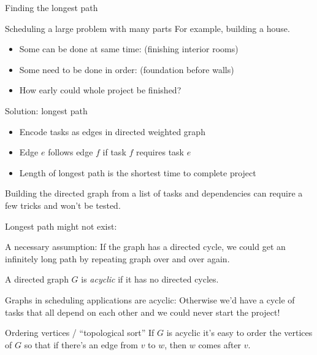 \documentclass{beamer}
\begin{document}
\begin{frame}{Finding the longest path}
  \begin{block}{Scheduling a large problem with many parts}
For example, building a house.
    \begin{itemize}
    \item Some can be done at same time: (finishing interior rooms)
    \item Some need to be done in order: (foundation before walls)
    \item How early could whole project be finished?
    \end{itemize}
  \end{block}
  \begin{block}{Solution: longest path}
    \begin{itemize}
    \item  Encode tasks as edges in directed weighted graph        
    \item Edge $e$ follows edge $f$ if task $f$ requires task $e$ 
    \item Length of longest path is the shortest time to complete project 
    \end{itemize}
\end{block}
Building the directed graph from a list of tasks and dependencies can require a few tricks and won't be tested.

\end{frame}

\begin{frame}{Longest path might not exist:}

  \begin{block}{A necessary assumption:}
    If the graph has a directed cycle, we could get an infinitely long path by repeating graph over and over again.  
  \end{block}

  \begin{definition}A directed graph $G$ is \emph{acyclic} if it has no directed cycles.
  \end{definition}

  \begin{block}{Graphs in scheduling applications are acyclic:}
 Otherwise we'd have a cycle of tasks that all depend on each other and we could never start the project!  
\end{block}

  \begin{block}{Ordering vertices / ``topological sort''}
    If $G$ is acyclic it's easy to order the vertices of $G$ so that if there's an edge from $v$ to $w$, then $w$ comes after $v$.
\end{block}
\end{frame}
\end{document}
